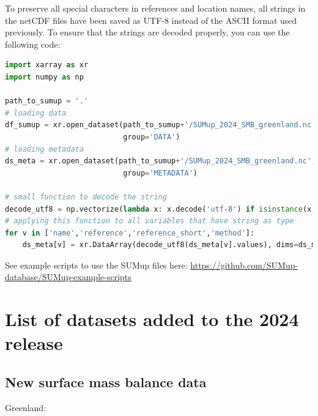 \documentclass[journal abbreviation, manuscript]{copernicus}
\begin{document}
\bigskip


To preserve all special characters in references and location names, all strings in the netCDF files have been saved as UTF-8 instead of the ASCII format used previously. To ensure that the strings are decoded properly, you can use the following code:

\begin{lstlisting}[language=python]
import xarray as xr
import numpy as np

path_to_sumup = '.'
# loading data
df_sumup = xr.open_dataset(path_to_sumup+'/SUMup_2024_SMB_greenland.nc',
                           group='DATA')
# loading metadata
ds_meta = xr.open_dataset(path_to_sumup+'/SUMup_2024_SMB_greenland.nc',
                           group='METADATA')

# small function to decode the string
decode_utf8 = np.vectorize(lambda x: x.decode('utf-8') if isinstance(x, bytes) else x)
# applying this function to all variables that have string as type
for v in ['name','reference','reference_short','method']:
    ds_meta[v] = xr.DataArray(decode_utf8(ds_meta[v].values), dims=ds_meta[v].dims)
\end{lstlisting}

See example scripts to use the SUMup files here: \url{https://github.com/SUMup-database/SUMup-example-scripts}



\section{List of datasets added to the 2024 release}
\subsection{New surface mass balance data}

Greenland:
\bigskip
\end{document}
